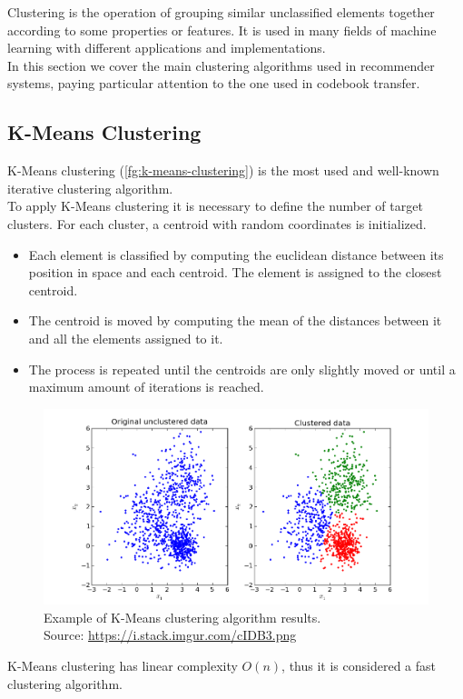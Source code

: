 Clustering is the operation of grouping similar unclassified elements together according to some properties or features. It is used in many fields of machine learning with different applications and implementations.\\
In this section we cover the main clustering algorithms used in recommender systems, paying particular attention to the one used in codebook transfer.


\subsection{K-Means Clustering}

K-Means clustering (\autoref{fg:k-means-clustering}) is the most used and well-known iterative clustering algorithm.\\
To apply K-Means clustering it is necessary to define the number of target clusters. For each cluster, a centroid with random coordinates is initialized.
\begin{itemize}
\item Each element is classified by computing the euclidean distance between its position in space and each centroid. The element is assigned to the closest centroid.
\item The centroid is moved by computing the mean of the distances between it and all the elements assigned to it.
\item The process is repeated until the centroids are only slightly moved or until a maximum amount of iterations is reached.
\end{itemize}
\begin{figure}[hbt]
\centering
\includegraphics[width=\textwidth]{pictures/k-means-clustering}
\caption{Example of K-Means clustering algorithm results.\\
Source: \url{https://i.stack.imgur.com/cIDB3.png}}
\label{fg:k-means-clustering}
\end{figure}
K-Means clustering has linear complexity $O(n)$, thus it is considered a fast clustering algorithm.


